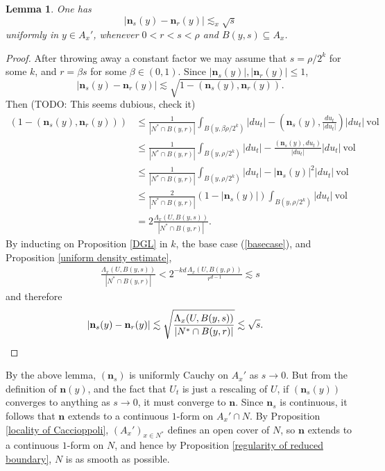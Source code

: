 \documentclass[reqno,12pt,letterpaper]{amsart}
\newcommand{\normal}{\mathbf n}
\newcommand{\vol}{\mathrm{vol}}
\newtheorem{lemma}[theorem]{Lemma}
\theoremstyle{definition}
\numberwithin{equation}{section}
\begin{document}
\begin{lemma}
One has
$$|\normal_s(y) - \normal_r(y)| \lesssim_x \sqrt s$$
uniformly in $y \in A_x'$, whenever $0 < r < s < \rho$ and $B(y, s) \subseteq A_x$.
\end{lemma}
\begin{proof}
After throwing away a constant factor we may assume that $s = \rho/2^k$ for some $k$, and $r = \beta s$ for some $\beta \in (0, 1)$.
Since $|\normal_s(y)|,|\normal_r(y)| \leq 1$,
$$|\normal_s(y) - \normal_r(y)| \lesssim \sqrt{1 - (\normal_s(y), \normal_r(y))}.$$
Then (TODO: This seems dubious, check it)
\begin{align*}
(1 - (\normal_s(y), \normal_r(y)))  &\leq \frac{1}{|N^* \cap B(y, r)|} \int_{B(y, \beta \rho/2^k)} |du_t| - \left(\normal_s(y), \frac{du_t}{|du_t|}\right) |du_t| ~\vol\\
&\leq \frac{1}{|N^* \cap B(y, r)|} \int_{B(y, \rho/2^k)} |du_t| - \frac{(\normal_s(y), du_t)}{|du_t|} |du_t| ~\vol \\
&\leq \frac{1}{|N^* \cap B(y, r)|} \int_{B(y, \rho/2^k)} |du_t| - |\normal_s(y)|^2 |du_t| ~\vol\\
&\leq \frac{2}{|N^* \cap B(y, r)|} (1 - |\normal_s(y)|)\int_{B(y, \rho/2^k)} |du_t| ~\vol\\
&= 2\frac{\Lambda_x(U, B(y, s))}{|N^* \cap B(y, r)|}.
\end{align*}
By inducting on Proposition \ref{DGL} in $k$, the base case (\ref{basecase}), and Proposition \ref{uniform density estimate},
\begin{align*}
\frac{\Lambda_x(U, B(y, s))}{|N^* \cap B(y, r)|} < 2^{-kd} \frac{\Lambda_x(U, B(y, \rho))}{r^{d - 1}} \lesssim s
\end{align*}
and therefore
\begin{align*}
|\normal_s(y) - \normal_r(y)| &\lesssim \sqrt{\frac{\Lambda_x(U, B(y, s))}{|N^* \cap B(y, r)|}} \lesssim \sqrt s. \qedhere
\end{align*}
\end{proof}

By the above lemma, $(\normal_s)$ is uniformly Cauchy on $A_x'$ as $s \to 0$.
But from the definition of $\normal(y)$, and the fact that $U_t$ is just a rescaling of $U$, if $(\normal_s(y))$ converges to anything as $s \to 0$, it must converge to $\normal$.
Since $\normal_s$ is continuous, it follows that $\normal$ extends to a continuous $1$-form on $A_x' \cap N$.
By Proposition \ref{locality of Caccioppoli}, $(A_x')_{x \in N^*}$ defines an open cover of $N$, so $\normal$ extends to a continuous $1$-form on $N$, and hence by Proposition \ref{regularity of reduced boundary}, $N$ is as smooth as possible.
\end{document}
